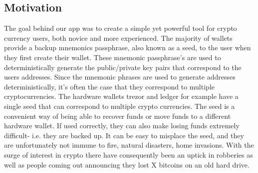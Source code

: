 \subsection{Motivation}
The goal behind our app was to create a simple yet powerful tool for crypto currency users, both novice and more experienced. The majority of wallets provide a backup
mnemonics passphrase, also known as a seed, to the user when they first create their wallet. These mnemonic passphrase's are used to deterministically generate the public/private key
pairs that correspond to the users addresses. Since the mnemonic phrases are used to generate addresses deterministically, it's often the case that they correspond to multiple
cryptocurrencies. The hardware wallets trezor and ledger for example have a single seed that can correspond to multiple crypto currencies. The seed is a convenient way of being able
to recover funds or move funds to a different hardware wallet. If used correctly, they can also make losing funds extremely difficult- i.e. they are backed up. It can be easy to misplace the seed, and
they are unfortunately not immune to fire, natural disasters, home invasions. With the surge of interest in crypto there have consequently been an uptick in robberies as well as people
coming out announcing they lost X bitcoins on an old hard drive.



